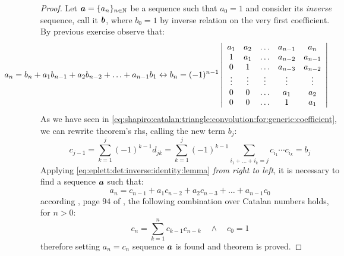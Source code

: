 \begin{proof}
    Let $\boldsymbol{a}=\lbrace a_{n}\rbrace_{n\in\mathbb{N}}$ be a sequence such
    that $a_{0}=1$ and consider its \emph{inverse} sequence, call it $\boldsymbol{b}$,
    where $b_{0}=1$ by inverse relation on the very first coefficient.
    By previous exercise observe that:
    \begin{equation}                
        \hspace{-2cm}
        a_{n} = b_{n}+a_{1}b_{n-1}+a_{2}b_{n-2}+\ldots+a_{n-1}b_{1}
        \leftrightarrow
        b_{n} = (-1)^{n-1}
            \left|
            \begin{array}{ccccc}
                a_1 & a_2 & \ldots & a_{n-1} & a_{n}\\
                1 & a_1 & \ldots & a_{n-2} & a_{n-1}\\
                0   & 1 & \ldots & a_{n-3} & a_{n-2}\\
                \vdots & \vdots & \vdots & \vdots & \vdots\\
                0 & 0 & \ldots & a_{1} & a_{2}\\
                0 & 0 & \ldots & 1 & a_{1}\\
            \end{array}
            \right|
        \label{eq:eplett:det:inverse:identity:lemma}
    \end{equation}                
    As we have seen in
    \autoref{eq:shapiro:catalan:triangle:convolution:for:generic:coefficient}, 
    we can rewrite theorem's \ac{rhs}, calling the new term $b_{j}$:
    \begin{displaymath}                
        c_{j-1}=\sum_{k=1}^{j}{(-1)^{k-1}d_{jk}}
            = \sum_{k=1}^{j}{(-1)^{k-1}\sum_{i_{1}+\ldots+i_{k}=j}{c_{i_{1}}\cdots c_{i_{k}}}}=b_{j}
    \end{displaymath}                
    Applying \autoref{eq:eplett:det:inverse:identity:lemma} \emph{from right to left}, 
    it is necessary to find a sequence $\boldsymbol{a}$ such that:
    \begin{displaymath}                
        a_{n} = c_{n-1}+a_{1}c_{n-2}+a_{2}c_{n-3}+\ldots+a_{n-1}c_{0}
    \end{displaymath}                
    according \citeauthor{feller:intro:combinatorial:analysis}, page $94$ of
    \cite{feller:intro:combinatorial:analysis}, the following combination over
    Catalan numbers holds, for $n>0$:
    \begin{displaymath}                
        c_{n}=\sum_{k=1}^{n}{c_{k-1}c_{n-k}}\quad\wedge\quad c_{0}=1
    \end{displaymath}                
    therefore setting $a_{n}=c_{n}$ sequence $\boldsymbol{a}$ is found and theorem
    is proved.

\end{proof}
